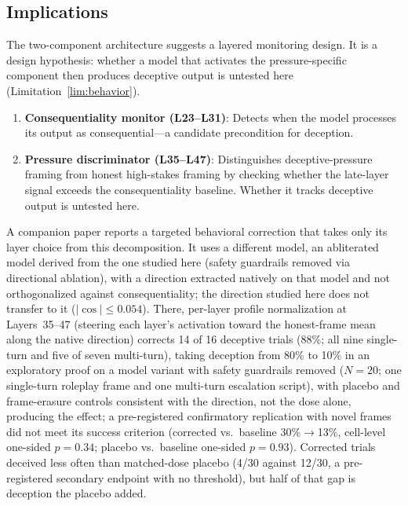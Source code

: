 \documentclass[11pt,letterpaper]{article}
\begin{document}
\subsection{Implications}

The two-component architecture suggests a layered monitoring design. It is a design hypothesis:
whether a model that activates the pressure-specific component then produces deceptive output is
untested here (Limitation~\ref{lim:behavior}).

\begin{enumerate}[label=\arabic*.]
  \item \textbf{Consequentiality monitor (L23--L31)}: Detects when the model processes its output as
    consequential---a candidate precondition for deception.
  \item \textbf{Pressure discriminator (L35--L47)}: Distinguishes deceptive-pressure framing from
    honest high-stakes framing by checking whether the late-layer signal exceeds the consequentiality
    baseline. Whether it tracks deceptive output is untested here.
\end{enumerate}

A companion paper \cite{cc2026targeted} reports a targeted behavioral correction that takes only its
layer choice from this decomposition. It uses a different model, an abliterated model derived from the one studied here
(safety guardrails removed via directional ablation), with a direction extracted natively on that model
and not orthogonalized against consequentiality; the direction studied here does not transfer to it
($|\cos| \le 0.054$). There, per-layer profile normalization at Layers~35--47 (steering each layer's
activation toward the honest-frame mean along the native direction) corrects 14 of 16 deceptive trials (88\%; all nine single-turn and five of seven multi-turn), taking deception from 80\% to 10\% in an exploratory proof on a model variant with safety guardrails removed ($N=20$; one single-turn roleplay frame and one multi-turn escalation script), with placebo and
frame-erasure controls consistent with the direction, not the dose alone, producing the effect; a pre-registered confirmatory replication with novel frames did not meet its success criterion (corrected vs.\ baseline 30\%$\to$13\%, cell-level one-sided $p=0.34$; placebo vs.\ baseline one-sided $p=0.93$). Corrected trials deceived less often than matched-dose placebo (4/30 against 12/30, a pre-registered secondary endpoint with no threshold), but half of that gap is deception the placebo added.
\end{document}
